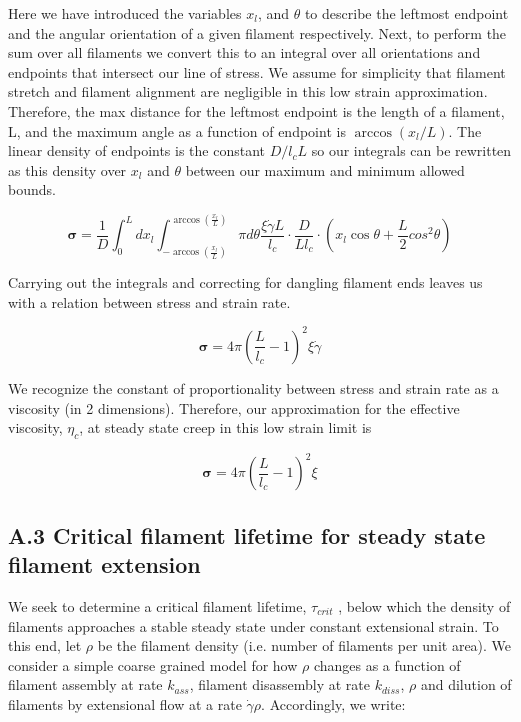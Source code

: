\documentclass[10pt,letterpaper]{article}
\begin{document}
Here we have introduced the variables $x_l$, and $\theta$ to describe the leftmost endpoint and the angular orientation of a given filament respectively.  Next, to perform the sum over all filaments we convert this to an integral over all orientations and endpoints that intersect our line of stress. We assume for simplicity that filament stretch and filament alignment are negligible in this low strain approximation.  Therefore, the max distance for the leftmost endpoint is the length of a filament, L, and the maximum angle as a function of endpoint is $\arccos(x_l/L)$.  The linear density of endpoints is the constant $D/l_cL$ so our integrals can be rewritten as this density over $x_l$ and $\theta$ between our maximum and minimum allowed bounds.

\begin{equation}
\mathbf{\sigma} =  \frac{1}{D} \int_0^L dx_l \int_{-\arccos (\frac{x_l}{L})}^{\arccos (\frac{x_l}{L})}\pi d\theta \frac{\xi \dot \gamma L}{l_c} \cdot \frac{D}{Ll_c}\cdot (x_l \cos \theta + \frac{L}{2} cos^2\theta)
\end{equation}

Carrying out the integrals and correcting for dangling filament ends leaves us with a relation between stress and strain rate.

\begin{equation}
\mathbf{\sigma} = 4 \pi \left ( \frac{ L}{l_c}-1 \right)^2 \xi \dot \gamma 
\end{equation}

We recognize the constant of proportionality between stress and strain rate as a viscosity (in 2 dimensions).  Therefore, our approximation for the effective viscosity, $\eta_{c}$, at steady state creep in this low strain limit is

\begin{equation}
\label{lin_eqn}
\mathbf{\sigma} = 4 \pi \left ( \frac{ L}{l_c}-1 \right)^2 \xi
\end{equation}



\subsection*{A.3 Critical filament lifetime for steady state filament extension}
We seek to determine a critical filament lifetime, $\tau_{crit}$ , below which the density of filaments approaches a stable steady state under constant extensional strain. To this end, let $\rho$ be the filament density (i.e. number of filaments per unit area). We consider a simple coarse grained model for how $\rho$ changes as a function of filament assembly at rate $k_{ass}$, filament disassembly at rate $k_{diss}$, $\rho$ and dilution of filaments by extensional flow at a rate $\dot{\gamma}\rho$. Accordingly, we write:
\end{document}
